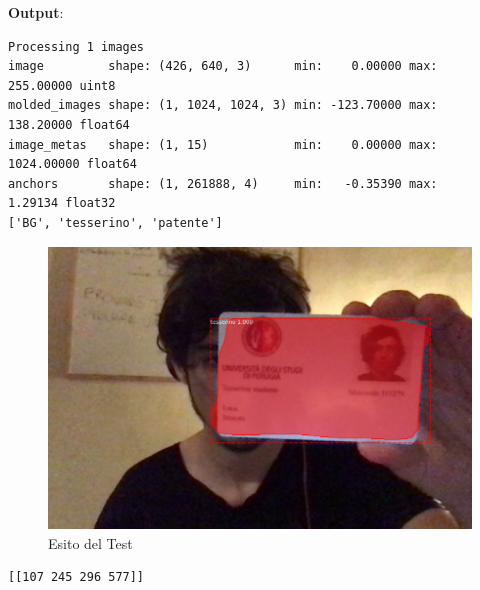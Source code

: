 \documentclass[12pt,a4paper]{article}
\begin{document}
\textbf{Output}:

\begin{verbatim}
Processing 1 images
image         shape: (426, 640, 3)      min:    0.00000 max:  255.00000 uint8
molded_images shape: (1, 1024, 1024, 3) min: -123.70000 max:  138.20000 float64
image_metas   shape: (1, 15)            min:    0.00000 max: 1024.00000 float64
anchors       shape: (1, 261888, 4)     min:   -0.35390 max:    1.29134 float32
['BG', 'tesserino', 'patente']
\end{verbatim}

\begin{figure}[H]
    \caption{Esito del Test}
    \centering
    \includegraphics[width=\textwidth,height=\textheight,keepaspectratio]{document_recognition_29_1.png}
\end{figure}

\begin{verbatim}
[[107 245 296 577]]
\end{verbatim}
\end{document}
